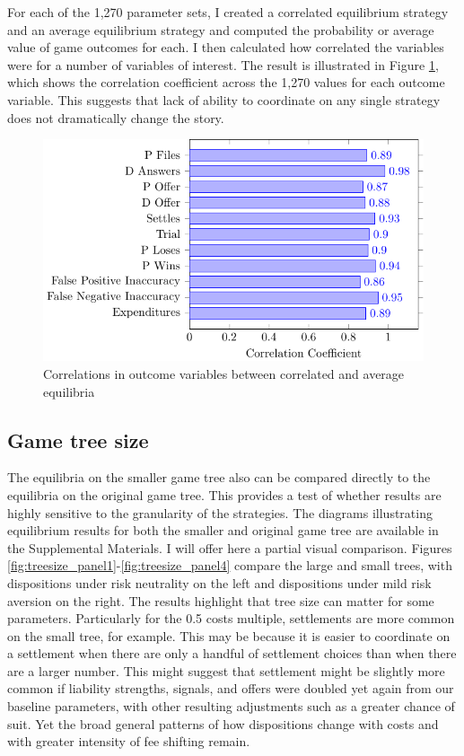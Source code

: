 \documentclass{article}
\begin{document}
For each of the 1,270 parameter sets, I created a correlated equilibrium strategy and an average equilibrium strategy and computed the probability or average value of game outcomes for each. I then calculated how correlated the variables were for a number of variables of interest. The result is illustrated in Figure \ref{fig:correlations_corrvsave}, which shows the correlation coefficient across the 1,270 values for each outcome variable. This suggests that lack of ability to coordinate on any single strategy does not dramatically change the story.  

\begin{figure}[h!]
\centering
\includegraphics[scale=0.5, trim={0in 0in 0in 0in}, clip]{../Figures/Correlation between correlated and average equilibrium.pdf}
\caption{Correlations in outcome variables between correlated and average equilibria}
\label{fig:correlations_corrvsave}
\end{figure}

\subsection{Game tree size}

The equilibria on the smaller game tree also can be compared directly to the equilibria on the original game tree. This provides a test of whether results are highly sensitive to the granularity of the strategies. The diagrams illustrating equilibrium results for both the smaller and original game tree are available in the Supplemental Materials. I will offer here a partial visual comparison. Figures \ref{fig:treesize_panel1}-\ref{fig:treesize_panel4} compare the large and small trees, with dispositions under risk neutrality on the left and dispositions under mild risk aversion on the right. The results highlight that tree size can matter for some parameters. Particularly for the 0.5 costs multiple, settlements are more common on the small tree, for example. This may be because it is easier to coordinate on a settlement when there are only a handful of settlement choices than when there are a larger number. This might suggest that settlement might be slightly more common if liability strengths, signals, and offers were doubled yet again from our baseline parameters, with other resulting adjustments such as a greater chance of suit. Yet the broad general patterns of how dispositions change with costs and with greater intensity of fee shifting remain. 
\end{document}

